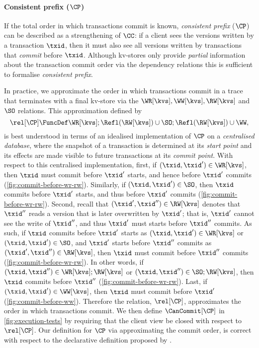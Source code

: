 \paragraph{Consistent prefix (\( \CP \))}
If the total order in which transactions commit is known, 
\emph{consistent prefix} (\(\CP\))  can be described as a strengthening of \(\CC\): 
if a client sees the versions written by a transaction \(\txid\),
then it must also see all versions written by transactions that \emph{commit} before \(\txid\). 
Although kv-stores only provide \emph{partial} information about 
the transaction commit order via the dependency relations
this is sufficient to formalise \emph{consistent prefix}.



In practice, we approximate the order in which transactions commit in a trace 
that terminates with a final kv-store \kvs via the \(\WR[\kvs], \WW[\kvs], \RW[\kvs] \) 
and \( \SO\)  relations. 
This approximation defined by 
\[
    \rel[\CP] \FuncDef \WR[\kvs]; \Refl(\RW[\kvs]) \cup \SO; \Refl(\RW[\kvs]) \cup \WW,
\]
is best understood in terms of an idealised implementation of \(\CP\) on a \emph{centralised database},
where the snapshot of a transaction is determined at its \emph{start point}
and its effects are made visible to future transactions at its \emph{commit point}.
With respect to this centralised implementation, first, if \((\txid,\txid') \in \WR[\kvs]\), 
then \(\txid\) must commit before \(\txid'\) starts, and hence before \(\txid'\) commits (\cref{fig:commit-before-wr-rw}).
Similarly, if \((\txid,\txid') \in \SO\), then \(\txid\) commits before \(\txid'\) starts, 
and thus before \(\txid'\) commits (\cref{fig:commit-before-wr-rw}).
Second, recall that \((\txid', \txid'') \in \RW[\kvs]\) denotes that 
\(\txid''\) reads a version that is later overwritten by \(\txid'\);
that is, \(\txid'\) cannot see the write of \(\txid''\), 
and thus \(\txid'\) must starts before \(\txid''\) commits. 
As such, if \(\txid\) commits before \(\txid'\) starts as
\((\txid, \txid') \in \WR[\kvs]\) or \((\txid,\txid') \in \SO\), 
and \(\txid'\) starts before \(\txid''\) commits as \((\txid', \txid'') \in \RW[\kvs]\), 
then \(\txid\) must commit before \(\txid''\) commits (\cref{fig:commit-before-wr-rw}). 
In other words, if \((\txid,\txid'') \in \WR[\kvs];\RW[\kvs]\) or \((\txid,\txid'') \in \SO;\RW[\kvs]\), 
then \(\txid\) commits before \(\txid''\) (\cref{fig:commit-before-wr-rw}).
Last, if \((\txid,\txid') \in\WW[\kvs]\), then \(\txid\) must commit before \(\txid'\) (\cref{fig:commit-before-ww}). 
Therefore the relation, \(\rel[\CP] \), approximates the order in which transactions commit. 
We then define \(\CanCommit[\CP]\) in \cref{fig:execution-tests} by requiring that
the client view be closed with respect to \(\rel[\CP]\).
Our definition for \( \CP \) via approximating the commit order, 
is correct with respect to the declarative definition proposed by \citet{laws}.

